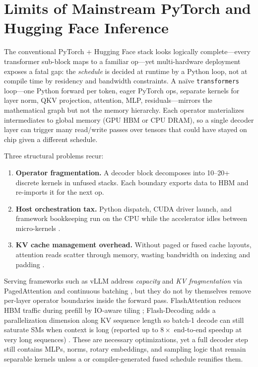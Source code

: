 \section{Limits of Mainstream PyTorch and Hugging Face Inference}
\label{sec:framework_issues}

The conventional PyTorch + Hugging Face stack looks logically complete---every transformer sub-block maps to a familiar op---yet multi-hardware deployment exposes a fatal gap: the \emph{schedule} is decided at runtime by a Python loop, not at compile time by residency and bandwidth constraints.
A na\"ive \texttt{transformers} loop---one Python forward per token, eager PyTorch ops, separate kernels for layer norm, QKV projection, attention, MLP, residuals---mirrors the mathematical graph but not the memory hierarchy.
Each operator materializes intermediates to global memory (GPU HBM or CPU DRAM), so a single decoder layer can trigger many read/write passes over tensors that could have stayed on chip given a different schedule.

Three structural problems recur:
\begin{enumerate}
\item \textbf{Operator fragmentation.} A decoder block decomposes into 10--20+ discrete kernels in unfused stacks. Each boundary exports data to HBM and re-imports it for the next op.
\item \textbf{Host orchestration tax.} Python dispatch, CUDA driver launch, and framework bookkeeping run on the CPU while the accelerator idles between micro-kernels \citep{taxbreak2026}.
\item \textbf{KV cache management overhead.} Without paged or fused cache layouts, attention reads scatter through memory, wasting bandwidth on indexing and padding \citep{kwon2023vllm,dao2022flashattention}.
\end{enumerate}

Serving frameworks such as vLLM address \emph{capacity} and \emph{KV fragmentation} via PagedAttention and continuous batching \citep{kwon2023vllm}, but they do not by themselves remove per-layer operator boundaries inside the forward pass.
FlashAttention reduces HBM traffic during prefill by IO-aware tiling \citep{dao2022flashattention}; Flash-Decoding adds a parallelization dimension along KV sequence length so batch-1 decode can still saturate SMs when context is long (reported up to $8\times$ end-to-end speedup at very long sequences) \citep{dao2023flashdecoding}.
These are necessary optimizations, yet a full decoder step still contains MLPs, norms, rotary embeddings, and sampling logic that remain separable kernels unless a  or compiler-generated fused schedule reunifies them.

